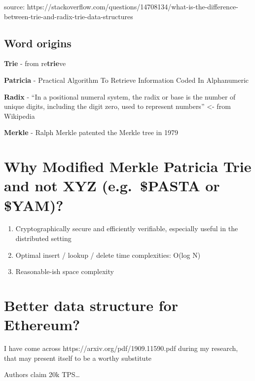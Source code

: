 \documentclass[11pt]{article}
\makeatletter
\providecommand{\tightlist}{%
      \setlength{\itemsep}{0pt}\setlength{\parskip}{0pt}}
\newcommand{\boxspacing}{\kern\kvtcb@left@rule\kern\kvtcb@boxsep}
\newcommand{\prompt}[4]{
        \ttfamily\llap{{\color{#2}[#3]:\hspace{3pt}#4}}\vspace{-\baselineskip}
    }
\makeatother
\begin{document}
    source:
https://stackoverflow.com/questions/14708134/what-is-the-difference-between-trie-and-radix-trie-data-structures

    \hypertarget{word-origins}{%
\subsection{Word origins}\label{word-origins}}

\textbf{Trie} - from re\textbf{trie}ve

\textbf{Patricia} - Practical Algorithm To Retrieve Information Coded In
Alphanumeric

\textbf{Radix} - ``In a positional numeral system, the radix or base is
the number of unique digits, including the digit zero, used to represent
numbers'' \textless- from Wikipedia

\textbf{Merkle} - Ralph Merkle patented the Merkle tree in 1979

    \hypertarget{why-modified-merkle-patricia-trie-and-not-xyz-e.g.-pasta-or-yam}{%
\section{Why Modified Merkle Patricia Trie and not XYZ (e.g.~\$PASTA or
\$YAM)?}\label{why-modified-merkle-patricia-trie-and-not-xyz-e.g.-pasta-or-yam}}

\begin{enumerate}
\def\labelenumi{\arabic{enumi}.}
\tightlist
\item
  Cryptographically secure and efficiently verifiable, especially useful
  in the distributed setting
\item
  Optimal insert / lookup / delete time complexities: O(log N)
\item
  Reasonable-ish space complexity
\end{enumerate}

    \hypertarget{better-data-structure-for-ethereum}{%
\section{Better data structure for
Ethereum?}\label{better-data-structure-for-ethereum}}

    I have come across https://arxiv.org/pdf/1909.11590.pdf during my
research, that may present itself to be a worthy substitute

Authors claim 20k TPS\ldots{}

    \begin{tcolorbox}[breakable, size=fbox, boxrule=1pt, pad at break*=1mm,colback=cellbackground, colframe=cellborder]
\prompt{In}{incolor}{ }{\boxspacing}
\begin{Verbatim}[commandchars=\\\{\}]

\end{Verbatim}
\end{tcolorbox}


    
    
    
\end{document}
